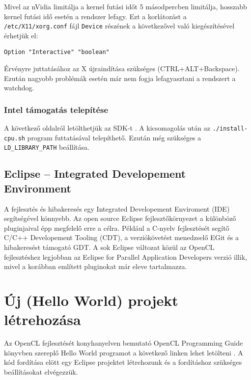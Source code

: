 Mivel az nVidia limitálja a kernel futási időt 5 másodpercben limitálja,
hosszabb kernel futási idő esetén a rendszer lefagy.
Ezt a korlátozást a \texttt{/etc/X11/xorg.conf} fájl \texttt{Device} részének a
következővel való kiegészítésével érhetjük el:
\begin{lstlisting}
Option "Interactive" "boolean"
\end{lstlisting}
Érvényre juttatásához az X újraindítása szükséges (CTRL+ALT+Backspace).
Ezután nagyobb problémák esetén már nem fogja lefagyasztani a rendszert a
watchdog.

\subsubsection{Intel támogatás telepítése}
A következő oldalról letölthetjük az SDK-t \cite{intel-sdk}.
A kicsomagolás után az \texttt{./install-cpu.sh} program futtatásával
telepíthető.
Ezután még szükséges a \texttt{LD\_LIBRARY\_PATH} beállítása.

\subsection{Eclipse – Integrated Developement Environment}
A fejlesztés és hibakeresés egy Integrated Developement Enviroment (IDE)
segítségével könnyebb.
Az open source Eclipse \cite{eclipse} fejlesztőkörnyezet a különböző pluginjaival épp
megfelelő erre a célra.
Például a C-nyelv fejlesztését segítő C/C++ Developement Tooling (CDT),
a verziókövetést menedzselő EGit és a hibakeresést támogató GDT.
A sok Eclipse változat közül az OpenCL fejlesztéshez legjobban az
Eclipse for Parallel Application Developers verzió illik, mivel a korábban említett pluginokat már eleve tartalmazza.


\section{Új (Hello World) projekt létrehozása}
Az OpenCL fejlesztését konyhanyelven bemutató OpenCL Programming Guide \cite{openclbook}
könyvben szereplő Hello World programot a következő linken lehet letölteni
\cite{hellow}.
A kód fordítása elött egy Eclipse projektet létrehozunk és a
fordításhoz szükséges beállításokat elvégezzük.

